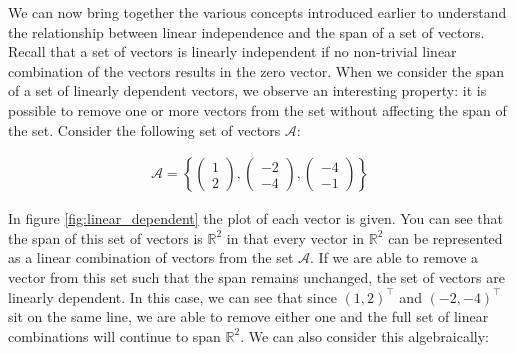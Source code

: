 \documentclass[12pt]{book}
\begin{document}
	We can now bring together the various concepts introduced earlier to understand the relationship between linear independence and the span of a set of vectors. Recall that a set of vectors is linearly independent if no non-trivial linear combination of the vectors results in the zero vector. When we consider the span of a set of linearly dependent vectors, we observe an interesting property: it is possible to remove one or more vectors from the set without affecting the span of the set. Consider the following set of vectors $\mathcal{A}$:
	
	\begin{align}
		\mathcal{A} = \left\{\begin{pmatrix} 1 \\ 2 \end{pmatrix},\begin{pmatrix} -2 \\ -4 \end{pmatrix},\begin{pmatrix} -4 \\ -1 \end{pmatrix} \right\}
	\end{align}
	
	 In figure \ref{fig:linear_dependent} the plot of each vector is given. You can see that the span of this set of vectors is $\mathbb{R}^2$ in that every vector in $\mathbb{R}^2$ can be represented as a linear combination of vectors from the set $\mathcal{A}$. If we are able to remove a vector from this set such that the span remains unchanged, the set of vectors are linearly dependent. In this case, we can see that since $(1, 2)^{\top}$ and $(-2, -4)^{\top}$ sit on the same line, we are able to remove either one and the full set of linear combinations will continue to span $\mathbb{R}^2$. We can also consider this algebraically: 
	 
\end{document}
